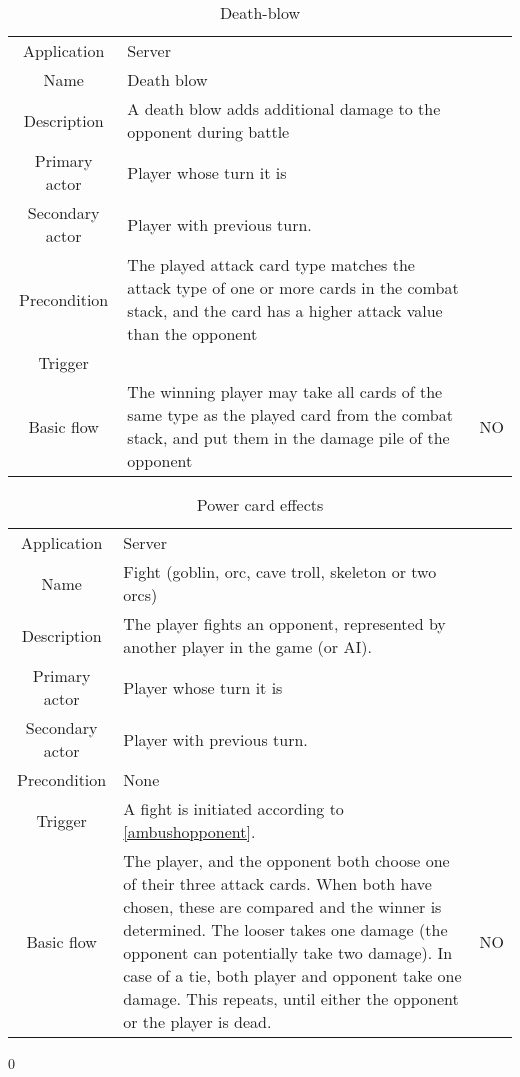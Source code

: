 \begin{table}
\caption{Death-blow}
\label{fight_deathblow}
\begin{tabular}{|c| p{9cm}|c}
\hline
Application & Server & \\
Name & Death blow & \\
Description & A death blow adds additional damage to the opponent during battle & \\
Primary actor & Player whose turn it is & \\
Secondary actor & Player with previous turn. & \\
Precondition & The played attack card type matches the attack type of one or more cards in the combat stack, and the card has a higher attack value than the opponent & \\
Trigger &  & \\ \hline
Basic flow & The winning player may take all cards of the same type as the played card from the combat stack, and put them in the damage pile of the opponent & NO\\
\hline
\end{tabular}
\end{table}



\begin{table}
\caption{Power card effects}
\label{fight_powercard}
\begin{tabular}{|c| p{9cm}|c}
\hline
Application & Server & \\
Name & Fight (goblin, orc, cave troll, skeleton or two orcs) & \\
Description & The player fights an opponent, represented by another player in the game (or AI). & \\
Primary actor & Player whose turn it is & \\
Secondary actor & Player with previous turn. & \\
Precondition & None & \\
Trigger & A fight is initiated according to \ref{ambushopponent}. & \\ \hline
Basic flow & The player, and the opponent both choose one of their three attack cards. When both have chosen, these are compared and the winner is determined. The looser takes one damage (the opponent can potentially take two damage). In case of a tie, both player and opponent take one damage. This repeats, until either the opponent or the player is dead. & NO\\ \hline
\hline
\end{tabular}
\end{table}
0



